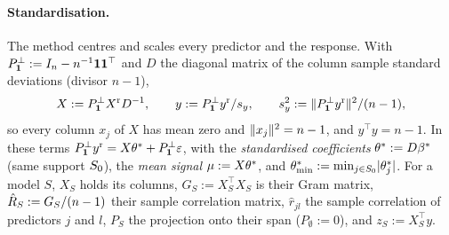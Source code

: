 \paragraph{Standardisation.} The method centres and scales every predictor and the response. With
$P^\perp_{\mathbf{1}}:=I_n-n^{-1}\mathbf{1}\mathbf{1}^\top$ and $D$ the diagonal matrix of the column sample standard deviations (divisor
$n-1$),
\begin{equation}\label{eq:standardise}
  X:=P^\perp_{\mathbf{1}}X^{\mathrm r} D^{-1},\qquad y:=P^\perp_{\mathbf{1}}y^{\mathrm r}/s_y,\qquad s_y^2:=\lVert P^\perp_{\mathbf{1}}y^{\mathrm r}\rVert^2/(n-1),
\end{equation}
so every column $x_j$ of $X$ has mean zero and $\lVert x_j\rVert^2=n-1$, and $y^\top y=n-1$. In these terms
$P^\perp_{\mathbf{1}}y^{\mathrm r}=X\theta^*+P^\perp_{\mathbf{1}}\varepsilon$, with the \emph{standardised coefficients} $\theta^*:=D\beta^*$ (same
support $S_0$), the \emph{mean signal} $\mu:=X\theta^*$, and $\theta^*_{\min}:=\min_{j\in S_0}\lvert \theta^*_j\rvert$. For a model $S$, $X_S$
holds its columns, $G_S:=X_S^\top X_S$ is their Gram matrix, $\hat R_S:=G_S/(n-1)$ their sample correlation matrix,
$\hat r_{jl}$ the sample correlation of predictors $j$ and $l$, $P_S$ the projection onto their span ($P_\emptyset:=0$),
and $z_S:=X_S^\top y$.
